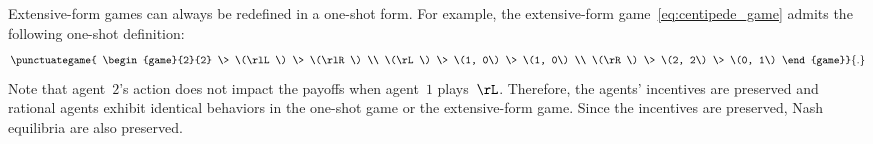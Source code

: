 \begin{note}
\label{note:extensive-form_games}
Extensive-form games can always be redefined in a one-shot form.
For example, the extensive-form game~\cref{eq:centipede_game} admits the following one-shot definition:
\begin{equation*}
\punctuategame{
\begin{game}{2}{2}
        \> \(\rlL\) \> \(\rlR\) \\
\(\rL\) \> \(1, 0\) \> \(1, 0\) \\
\(\rR\) \> \(2, 2\) \> \(0, 1\)
\end{game}}
{.}\bigskip
\end{equation*}
Note that agent~\(2\)'s action does not impact the payoffs when agent~\(1\) plays~\(\rL\).
Therefore, the agents' incentives are preserved and rational agents exhibit identical behaviors in the one-shot game or the extensive-form game.
Since the incentives are preserved, Nash equilibria are also preserved.
\end{note}

